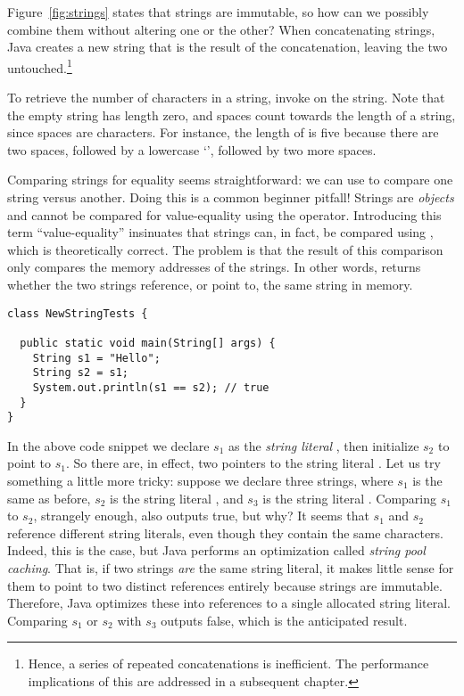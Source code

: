 Figure~\ref{fig:strings} states that strings are immutable, so how can we possibly combine them without altering one or the other? When concatenating strings, Java creates a new string that is the result of the concatenation, leaving the two untouched.\footnote{Hence, a series of repeated concatenations is inefficient. The performance implications of this are addressed in a subsequent chapter.}

To retrieve the number of characters in a string, invoke  on the string. Note that the empty string has length zero, and spaces count towards the length of a string, since spaces are characters. For instance, the length of  is five because there are two spaces, followed by a lowercase `', followed by two more spaces.

Comparing strings for equality seems straightforward: we can use \ttt{==} to compare one string versus another. Doing this is a common beginner pitfall! Strings are \emph{objects} and cannot be compared for value-equality using the \ttt{==} operator. Introducing this term ``value-equality'' insinuates that strings can, in fact, be compared using \ttt{==}, which is theoretically correct. The problem is that the result of this comparison only compares the memory addresses of the strings. In other words,  returns whether the two strings reference, or point to, the same string in memory. 
 
\begin{lstlisting}[language=MyJava]
class NewStringTests {

  public static void main(String[] args) {
    String s1 = "Hello";
    String s2 = s1;
    System.out.println(s1 == s2); // true
  }
}
\end{lstlisting}

In the above code snippet we declare $s_1$ as the \emph{string literal} , then initialize $s_2$ to point to $s_1$. So there are, in effect, two pointers to the string literal . Let us try something a little more tricky: suppose we declare three strings, where $s_1$ is the same as before, $s_2$ is the string literal , and $s_3$ is the string literal . Comparing $s_1$ to $s_2$, strangely enough, also outputs true, but why? It seems that $s_1$ and $s_2$ reference different string literals, even though they contain the same characters. Indeed, this is the case, but Java performs an optimization called \emph{string pool caching}. That is, if two strings \emph{are} the same string literal, it makes little sense for them to point to two distinct references entirely because strings are immutable. Therefore, Java optimizes these into references to a single allocated string literal. Comparing $s_1$ or $s_2$ with $s_3$ outputs false, which is the anticipated result.

